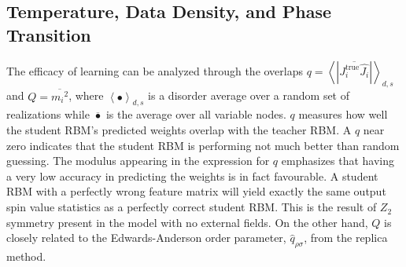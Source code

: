 \documentclass[%
 reprint,
 amsmath,amssymb,
 aps,
]{revtex4-2}
\begin{document}
\subsection{Temperature, Data Density, and Phase Transition}

The efficacy of learning can be analyzed through the overlaps $q=\left\langle \left| \overline{  J_i^{\text{true}} \hat{J_i}  } \right| \right\rangle_{d,s}$ and $Q=  \overline{{m_i}^2}  $, where $\left\langle \bullet  \right\rangle_{d,s}$ is a disorder average over a random set of realizations while $\overline{\bullet}$ is the average over all variable nodes. $q$ measures how well the student RBM's predicted weights overlap with the teacher RBM. A $q$ near zero indicates that the student RBM is performing not much better than random guessing. The modulus appearing in the expression for $q$ emphasizes that having a very low accuracy in predicting the weights is in fact favourable. A student RBM with a perfectly wrong feature matrix will yield exactly the same output spin value statistics as a perfectly correct student RBM. This is the result of $Z_2$ symmetry present in the model with no external fields. On the other hand, $Q$ is closely related to the Edwards-Anderson order parameter, $\hat{q}_{\rho \sigma}$, from the replica method. 
\end{document}
